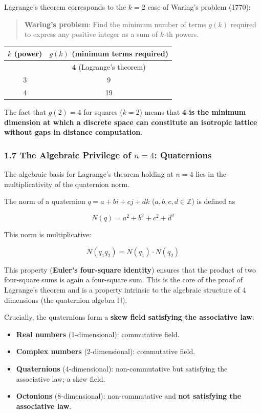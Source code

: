 \documentclass[a4paper,11pt]{article}
\providecommand{\tightlist}{\setlength{\itemsep}{0pt}\setlength{\parskip}{0pt}}
\newcounter{none}
\begin{document}
Lagrange's theorem corresponds to the \(k = 2\) case of Waring's problem
(1770):

\begin{quote}
\textbf{Waring's problem}: Find the minimum number of terms \(g(k)\)
required to express any positive integer as a sum of \(k\)-th powers.
\end{quote}

{\def\LTcaptype{none} %
\begin{longtable}[]{@{}cc@{}}
\toprule\noalign{}
\(k\) (power) & \(g(k)\) (minimum terms required) \\
\midrule\noalign{}
\endhead
\bottomrule\noalign{}
\endlastfoot
2 & \textbf{4} (Lagrange's theorem) \\
3 & 9 \\
4 & 19 \\
\end{longtable}
}

The fact that \(g(2) = 4\) for squares (\(k = 2\)) means that \textbf{4
is the minimum dimension at which a discrete space can constitute an
isotropic lattice without gaps in distance computation}.

\subsubsection{\texorpdfstring{1.7 The Algebraic Privilege of \(n = 4\):
Quaternions}{1.7 The Algebraic Privilege of n = 4: Quaternions}}\label{the-algebraic-privilege-of-n-4-quaternions}

The algebraic basis for Lagrange's theorem holding at \(n = 4\) lies in
the multiplicativity of the quaternion norm.

The norm of a quaternion \(q = a + bi + cj + dk\)
(\(a, b, c, d \in \mathbb{Z}\)) is defined as

\[N(q) = a^2 + b^2 + c^2 + d^2\]

This norm is multiplicative:

\[N(q_1 q_2) = N(q_1) \cdot N(q_2)\]

This property (\textbf{Euler's four-square identity}) ensures that the
product of two four-square sums is again a four-square sum. This is the
core of the proof of Lagrange's theorem and is a property intrinsic to
the algebraic structure of 4 dimensions (the quaternion algebra
\(\mathbb{H}\)).

Crucially, the quaternions form a \textbf{skew field satisfying the
associative law}:

\begin{itemize}
\tightlist
\item
  \textbf{Real numbers} (1-dimensional): commutative field.
\item
  \textbf{Complex numbers} (2-dimensional): commutative field.
\item
  \textbf{Quaternions} (4-dimensional): non-commutative but satisfying
  the associative law; a skew field.
\item
  \textbf{Octonions} (8-dimensional): non-commutative and \textbf{not
  satisfying the associative law}.
\end{itemize}
\end{document}
